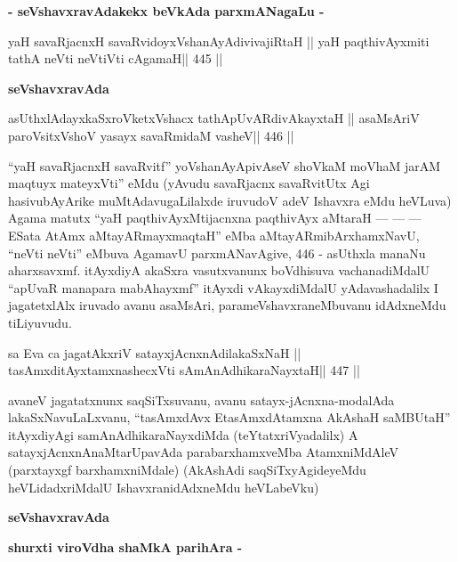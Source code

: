 \begin{center}
{\large{\textbf{- seVshavxravAdakekx beVkAda parxmANagaLu -}}}
\end{center}

\begin{shl}
yaH savaRjacnxH savaRvidoyxV\s shanAyAdivivajiRtaH ||
yaH paqthivAyxmiti tathA neVti neVtiVti cA\s\s gamaH\hfill || 445 ||
\end{shl}

\centerline{\textbf{seVshavxravAda}}
\smallskip

\begin{shl}
asUthxlAdayxkaSxroVketxVshacx tathA\s pUvARdivAkayxtaH ||
asaMsAriV paroV\s sitxVshoV yasayx savaRmidaM vasheV\hfill || 446 ||
\end{shl}

\begin{artha}
``yaH savaRjacnxH savaRvitf'' yoV\s shanAyApivAseV shoVkaM moVhaM
  jarAM maqtuyx mateyxVti'' eMdu (yAvudu savaRjacnx savaRvitUtx Agi
  hasivubAyArike muMtAdavugaLilalxde iruvudoV adeV Ishavxra eMdu
  heVLuva) Agama matutx ``yaH paqthivAyxMtijacnxna paqthivAyx aMtaraH
  --- --- --- ESata AtAmx aMtayARmayxmaqtaH'' eMba
  aMtayARmibArxhamxNavU, ``neVti neVti'' eMbuva AgamavU
  parxmANavAgive, 446 - asUthxla manaNu aharxsavxmf. itAyxdiyA akaSxra
  vasutxvanunx boVdhisuva vachanadiMdalU ``apUvaR manapara
  mabAhayxmf'' itAyxdi vAkayxdiMdalU yAdavashadalilx I jagatetxlAlx
  iruvado avanu asaMsAri, parameVshavxraneMbuvanu idAdxneMdu tiLiyuvudu.
\end{artha}

\begin{shl}
sa Eva ca jagatAkxriV satayxjAcnxnAdilakaSxNaH ||
tasAmxditAyxtamxnashecxVti sAmAnAdhikaraNayxtaH\hfill || 447 ||
\end{shl}

\begin{artha}
avaneV jagatatxnunx saqSiTxsuvanu, avanu satayx-jAcnxna-modalAda
lakaSxNavuLaLxvanu, ``tasAmxdAvx EtasAmxdAtamxna AkAshaH saMBUtaH''
itAyxdiyAgi samAnAdhikaraNayxdiMda (teYtatxriVyadalilx) A
satayxjAcnxnAnaMtarUpavAda parabarxhamxveMba AtamxniMdAleV (parxtayxgf
barxhamxniMdale) (AkAshAdi saqSiTxyAgideyeMdu heVLidadxriMdalU
IshavxranidAdxneMdu heVLabeVku)
\end{artha}

\begin{center}
{\textbf{seVshavxravAda}}

{\large{\textbf{shurxti viroVdha shaMkA parihAra -}}}
\end{center}


